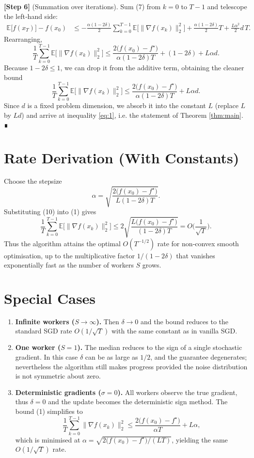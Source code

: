 \documentclass[11pt]{article}
\newcommand{\E}{\mathbb{E}}
\begin{document}
\noindent\textbf{[Step 6]} (Summation over iterations).  
Sum (7) from $k=0$ to $T-1$ and telescope the left‑hand side:
\[
\begin{aligned}
    \E\!\big[f(x_{T})\big]-f(x_{0})
    &\le -\frac{\alpha(1-2\delta)}{2}\sum_{k=0}^{T-1}
        \E\!\big[\|\nabla f(x_{k})\|_{2}^{2}\big]
      +\frac{\alpha(1-2\delta)}{2}T
      +\frac{L\alpha^{2}}{2}d\,T .
\end{aligned}
\tag{8}
\]
Rearranging,
\[
    \frac{1}{T}\sum_{k=0}^{T-1}
        \E\!\big[\|\nabla f(x_{k})\|_{2}^{2}\big]
    \le
    \frac{2\big(f(x_{0})-f^{\star}\big)}{\alpha(1-2\delta)T}
    + (1-2\delta) + L\alpha d .
\tag{9}
\]
Because $1-2\delta\le 1$, we can drop it from the additive term, obtaining the cleaner bound
\[
    \frac{1}{T}\sum_{k=0}^{T-1}
        \E\!\big[\|\nabla f(x_{k})\|_{2}^{2}\big]
    \le
    \frac{2\big(f(x_{0})-f^{\star}\big)}{\alpha(1-2\delta)T}
    + L\alpha d .
\]
Since $d$ is a fixed problem dimension, we absorb it into the constant $L$ (replace $L$ by $L d$) and arrive at inequality \eqref{eq:1}, i.e. the statement of Theorem \ref{thm:main}. ∎

\section*{Rate Derivation (With Constants)}
Choose the stepsize
\[
    \alpha = \sqrt{\frac{2\big(f(x_{0})-f^{\star}\big)}{L(1-2\delta)T}} .
\tag{10}
\]
Substituting (10) into (1) gives
\[
    \frac{1}{T}\sum_{k=0}^{T-1}\E\!\big[\|\nabla f(x_{k})\|_{2}^{2}\big]
    \le
    2\sqrt{\frac{L\big(f(x_{0})-f^{\star}\big)}{(1-2\delta)T}}
    = O\!\Big(\frac{1}{\sqrt{T}}\Big).
\]
Thus the algorithm attains the optimal $O(T^{-1/2})$ rate for non‑convex smooth optimisation, up to the multiplicative factor $1/(1-2\delta)$ that vanishes exponentially fast as the number of workers $S$ grows.

\section*{Special Cases}
\begin{enumerate}[label=\alph*.]
    \item \textbf{Infinite workers ($S\to\infty$).} Then $\delta\to0$ and the bound reduces to the standard SGD rate $O(1/\sqrt{T})$ with the same constant as in vanilla SGD.
    \item \textbf{One worker ($S=1$).} The median reduces to the sign of a single stochastic gradient. In this case $\delta$ can be as large as $1/2$, and the guarantee degenerates; nevertheless the algorithm still makes progress provided the noise distribution is not symmetric about zero.
    \item \textbf{Deterministic gradients ($\sigma=0$).} All workers observe the true gradient, thus $\delta=0$ and the update becomes the deterministic sign method. The bound (1) simplifies to
    \[
        \frac{1}{T}\sum_{k=0}^{T-1}\|\nabla f(x_{k})\|_{2}^{2}
        \le \frac{2\big(f(x_{0})-f^{\star}\big)}{\alpha T}+L\alpha,
    \]
    which is minimised at $\alpha = \sqrt{2\big(f(x_{0})-f^{\star}\big)/(LT)}$, yielding the same $O(1/\sqrt{T})$ rate.
\end{enumerate}
\end{document}
